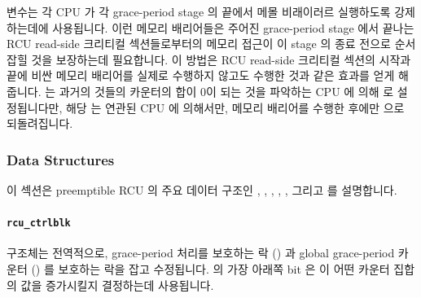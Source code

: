  변수는 각 CPU 가 각 grace-period stage 의 끝에서 메몰
비래이러르 실행하도록 강제하는데에 사용됩니다.
이런 메모리 배리어들은 주어진 grace-period stage 에서 끝나는 RCU read-side
크리티컬 섹션들로부터의 메모리 접근이 이 stage 의 종료 전으로 순서잡힐 것을
보장하는데 필요합니다.
이 방법은 RCU read-side 크리티컬 섹션의 시작과 끝에 비싼 메모리 배리어를 실제로
수행하지 않고도 수행한 것과 같은 효과를 얻게 해줍니다.
 는 과거의 것들의 카운터의 합이 0이 되는 것을 파악하는 CPU 에
의해  로 설정됩니다만, 해당  는 연관된 CPU 에
의해서만, 메모리 배리어를 수행한 후에만  으로 되돌려집니다.

\subsubsection{Data Structures}
\label{app:rcuimpl:Data Structures}

이 섹션은 preemptible RCU 의 주요 데이터 구조인
, , ,
, , 그리고
 를 설명합니다.

\paragraph{{\tt rcu\_ctrlblk}}
\label{app:rcuimpl:rcu_ctrlblk}

 구조체는 전역적으로, grace-period 처리를 보호하는 락
() 과 global grace-period 카운터 () 를 보호하는 락을
잡고 수정됩니다.
 의 가장 아래쪽 bit 은  이 어떤 카운터 집합의
값을 증가시킬지 결정하는데 사용됩니다.
\iffalse


